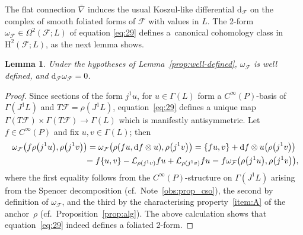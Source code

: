 \documentclass[pdftex]{sigma}
\numberwithin{equation}{section}
\newtheorem{Lemma}[Theorem]{Lemma}
\newcommand{\de}{\mathrm{d}} %
\newcommand{\HH}{\mathrm{H}}
\begin{document}
The f\/lat connection $\bar\nabla$ induces the usual Koszul-like dif\/ferential $\de_{\mathcal{F}}$ on the complex of smooth foliated forms of $\mathcal{F}$ with values in $L$. The 2-form $\omega_{\mathcal{F}}\in\Omega^2(\mathcal{F};L)$ of equation \eqref{eq:29} def\/ines a~canonical cohomology class in $\HH^2(\mathcal{F};L)$, as the next lemma shows.

\begin{Lemma}\label{lemma:coho_class} Under the hypotheses of Lemma~{\rm \ref{prop:well-defined}}, $\omega_{\mathcal{F}}$ is well defined, and $\de_{\mathcal{F}} \omega_{\mathcal{F}} = 0$.
\end{Lemma}

\begin{proof} Since sections of the form $j^1 u$, for $u \in \Gamma(L)$ form a $C^{\infty}(P)$-basis of $\Gamma(J^1 L)$ and $T \mathcal{F} = \rho(J^1 L)$, equation~\eqref{eq:29} def\/ines a unique map $\Gamma(T \mathcal{F}) \times \Gamma(T \mathcal{F}) \to \Gamma(L)$ which is manifestly antisymmetric. Let $f \in C^{\infty}(P)$ and f\/ix $u,v \in \Gamma(L)$; then
 \begin{gather*}
 \omega_{\mathcal{F}}\big(f\rho\big(j^1 u\big), \rho\big(j^1 v\big)\big) = \omega_{\mathcal{F}}\big(\rho(fu,\de f \otimes u), \rho\big(j^1v\big)\big) = \{fu,v\} + \de f \otimes u\big(\rho\big(j^1v\big)\big) \\
\hphantom{\omega_{\mathcal{F}}\big(f\rho\big(j^1 u\big), \rho\big(j^1 v\big)\big)}{}
=f\{u,v\} - \mathcal{L}_{\rho(j^1v)}f u + \mathcal{L}_{\rho(j^1v)}f u = f \omega_{\mathcal{F}}\big(\rho\big(j^1 u\big), \rho\big(j^1 v\big)\big),
\end{gather*}
where the f\/irst equality follows from the $C^{\infty}(P)$-structure on $\Gamma(J^1 L)$ arising from the Spencer decomposition (cf.\ Note~\ref{obs:prop_cso}), the second by def\/inition of $\omega_{\mathcal{F}}$, and the third by the characterising property~\ref{item:A} of the anchor~$\rho$ (cf.\ Proposition~\ref{prop:alg}). The above calculation shows that equation~\eqref{eq:29} indeed def\/ines a foliated 2-form.


\end{proof}
\end{document}
